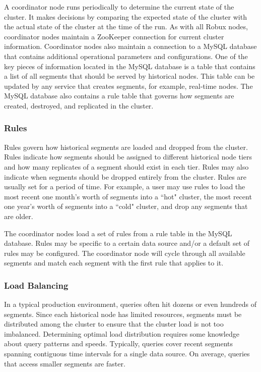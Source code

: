 \documentclass{sig-alternate-2013}
\begin{document}
A coordinator node runs periodically to determine the current state of the
cluster. It makes decisions by comparing the expected state of the cluster with
the actual state of the cluster at the time of the run. As with all Robux
nodes, coordinator nodes maintain a ZooKeeper connection for current cluster
information. Coordinator nodes also maintain a connection to a MySQL
database that contains additional operational parameters and configurations.
One of the key pieces of information located in the MySQL database is a table
that contains a list of all segments that should be served by historical nodes.
This table can be updated by any service that creates segments, for example,
real-time nodes. The MySQL database also contains a rule table that governs how
segments are created, destroyed, and replicated in the cluster.

\subsubsection{Rules}
Rules govern how historical segments are loaded and dropped from the cluster.
Rules indicate how segments should be assigned to different historical node
tiers and how many replicates of a segment should exist in each tier. Rules may
also indicate when segments should be dropped entirely from the cluster. Rules
are usually set for a period of time. For example, a user may use rules to
load the most recent one month's worth of segments into a ``hot" cluster, the
most recent one year's worth of segments into a ``cold" cluster, and drop any
segments that are older.

The coordinator nodes load a set of rules from a rule table in the MySQL
database. Rules may be specific to a certain data source and/or a default set
of rules may be configured. The coordinator node will cycle through all available
segments and match each segment with the first rule that applies to it.

\subsubsection{Load Balancing}
In a typical production environment, queries often hit dozens or even hundreds
of segments. Since each historical node has limited resources, segments must be
distributed among the cluster to ensure that the cluster load is not too
imbalanced. Determining optimal load distribution requires some knowledge about
query patterns and speeds. Typically, queries cover recent segments spanning
contiguous time intervals for a single data source. On average, queries that
access smaller segments are faster.
\end{document}

